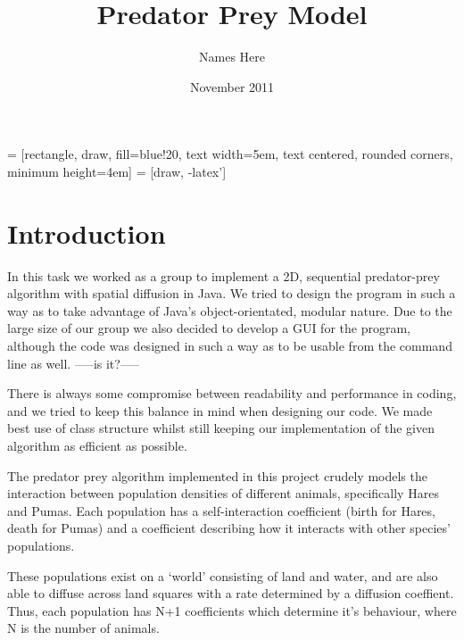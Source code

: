 \documentclass[12pt]{report}
\title{Predator Prey Model}
\author{Names Here}
\date{November 2011}
\begin{document}
\usetikzlibrary{shapes,arrows}


 = [rectangle, draw, fill=blue!20, 
    text width=5em, text centered, rounded corners, minimum height=4em]
 = [draw, -latex']

\maketitle

\begin{abstract}
\end{abstract}

\tableofcontents

\chapter{Introduction}


In this task we worked as a group to implement a 2D, sequential predator-prey algorithm with spatial diffusion
in Java. We tried to design the program in such a way as to take advantage of Java's object-orientated, modular nature. 
Due to the large size of our group we also decided to develop a GUI for the program, although the code was designed 
in such a way as to be usable from the command line as well. -----is it?-----\newline{}

There is always some compromise between readability and performance in coding, and we tried to keep this balance in mind
when designing our code. We made best use of class structure whilst still keeping our implementation of the given 
algorithm as efficient as possible.\newline{}

The predator prey algorithm implemented in this project crudely models the interaction between population densities of different animals, specifically Hares and Pumas. Each population has a self-interaction coefficient (birth for Hares, death for Pumas) and a coefficient describing how it interacts with other species' populations. \newline{}

These populations exist on a `world' consisting of land and water, and are also able to diffuse across land squares with a rate determined by a diffusion coeffient. Thus, each population has N+1 coefficients which determine it's behaviour, where N is the number of animals.
\end{document}

